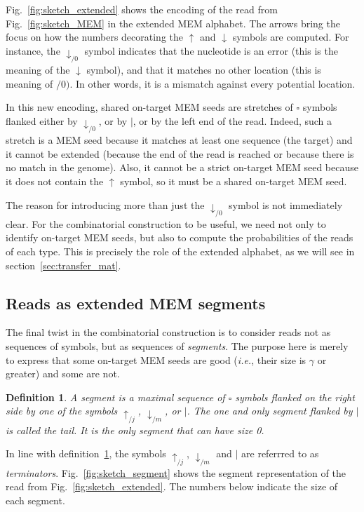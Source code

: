 \documentclass{article}
\newtheorem{definition}{Definition}
\begin{document}
Fig.~\ref{fig:sketch_extended} shows the encoding of the read from
Fig.~\ref{fig:sketch_MEM} in the extended MEM alphabet. The arrows bring
the focus on how the numbers decorating the $\uparrow$ and $\downarrow$
symbols are computed. For instance, the $\downarrow_{/0}$ symbol indicates
that the nucleotide is an error (this is the meaning of the $\downarrow$
symbol), and that it matches no other location (this is meaning of $/0)$.
In other words, it is a mismatch against every potential location.

In this new encoding, shared on-target MEM seeds are stretches of
$\square$ symbols flanked either by $\downarrow_{/0}$, or by $|$, or by
the left end of the read. Indeed, such a stretch is a MEM seed because it
matches at least one sequence (the target) and it cannot be extended
(because the end of the read is reached or because there is no match in
the genome). Also, it cannot be a strict on-target MEM seed because it
does not contain the $\uparrow$ symbol, so it must be a shared on-target
MEM seed.

The reason for introducing more than just the $\downarrow_{/0}$ symbol is
not immediately clear. For the combinatorial construction to be useful, we
need not only to identify on-target MEM seeds, but also to compute the
probabilities of the reads of each type. This is precisely the role of the
extended alphabet, as we will see in section~\ref{sec:transfer_mat}.

\subsection{Reads as extended MEM segments}

The final twist in the combinatorial construction is to consider reads not
as sequences of symbols, but as sequences of \emph{segments}. The purpose
here is merely to express that some on-target MEM seeds are good
(\textit{i.e.}, their size is $\gamma$ or greater) and some are not.


\begin{definition}
\label{def:segment}
A segment is a maximal sequence of $\square$ symbols flanked on the right
side by one of the symbols $\uparrow_{/j}$, $\downarrow_{/m}$, or $|$. The
one and only segment flanked by $|$ is called the tail. It is the only
segment that can have size 0.
\end{definition}


In line with definition~\ref{def:segment}, the symbols $\uparrow_{/j}$,
$\downarrow_{/m}$ and $|$ are referrred to as \emph{terminators}.
Fig.~\ref{fig:sketch_segment} shows the segment representation of the read
from Fig.~\ref{fig:sketch_extended}. The numbers below indicate the size
of each segment.
\end{document}
